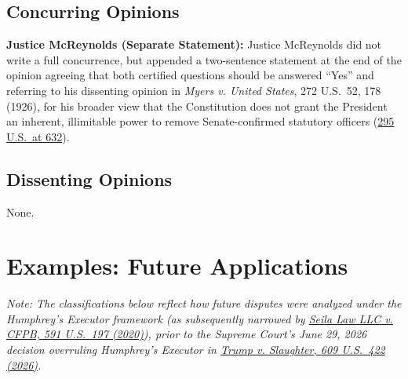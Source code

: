 \documentclass[12pt]{article}
\begin{document}
\subsection{Concurring Opinions}

\textbf{Justice McReynolds (Separate Statement):} Justice McReynolds did not write a full concurrence, but appended a two-sentence statement at the end of the opinion agreeing that both certified questions should be answered ``Yes'' and referring to his dissenting opinion in \textit{Myers v. United States}, 272 U.S.\ 52, 178 (1926), for his broader view that the Constitution does not grant the President an inherent, illimitable power to remove Senate-confirmed statutory officers (\href{https://caselaw.findlaw.com/court/us-supreme-court/295/602.html}{295 U.S.\ at 632}).

\subsection{Dissenting Opinions}

None.

\section{Examples: Future Applications}

\textit{Note: The classifications below reflect how future disputes were analyzed under the Humphrey's Executor framework (as subsequently narrowed by \href{https://www.supremecourt.gov/opinions/19pdf/19-7_n6io.pdf}{Seila Law LLC v. CFPB, 591 U.S.\ 197 (2020)}), prior to the Supreme Court's June 29, 2026 decision overruling Humphrey's Executor in \href{https://supreme.justia.com/cases/federal/us/609/25-332/}{Trump v. Slaughter, 609 U.S.\ 422 (2026)}.}
\end{document}
